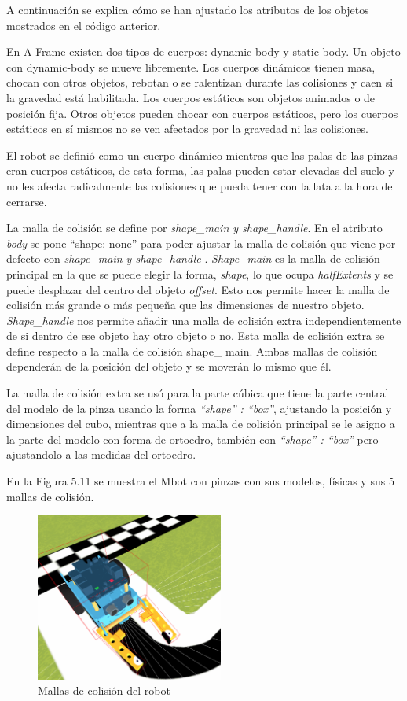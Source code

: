 A continuación se explica cómo se han ajustado los atributos de los objetos mostrados en el código anterior.

En A-Frame existen dos tipos de cuerpos: dynamic-body y static-body. Un objeto con dynamic-body  se mueve libremente. Los cuerpos dinámicos tienen masa, chocan con otros objetos, rebotan o se ralentizan durante las colisiones y caen si la gravedad está habilitada.
Los cuerpos estáticos son objetos animados o de posición fija. Otros objetos pueden chocar con cuerpos estáticos, pero los cuerpos estáticos en sí mismos no se ven afectados por la gravedad ni las colisiones.

El robot se definió como un cuerpo dinámico mientras que las palas de las pinzas eran cuerpos estáticos, de esta forma, las palas pueden estar elevadas del suelo y no les afecta  radicalmente las colisiones que pueda tener con la lata a la hora de cerrarse.

La malla de colisión se define por \textit{shape\_main y shape\_handle}. En el atributo \textit{body} se pone ``shape: none'' para poder ajustar la malla de colisión que viene por defecto con \textit{shape\_main y shape\_handle} .
\textit{Shape\_main} es la malla de colisión principal en la que se puede elegir la forma, \textit{shape}, lo que ocupa \textit{halfExtents} y se puede desplazar del centro del objeto \textit{offset}. Esto nos permite hacer la malla de colisión más grande o más pequeña que las dimensiones de nuestro objeto. \textit{ Shape\_handle} nos permite añadir una malla de colisión extra independientemente de si dentro de ese  objeto hay otro objeto o no. Esta malla de colisión extra se define respecto a la malla de colisión shape\_ main. Ambas mallas de colisión dependerán de la posición del objeto y se moverán lo mismo que él.

La malla de colisión extra se usó para la parte cúbica que tiene la parte central del modelo de la pinza usando la forma  \textit{ ``shape'' : ``box''},  ajustando  la posición y dimensiones del cubo, mientras que a la malla de colisión principal se le asigno a la parte del modelo con forma de ortoedro, también con \textit{ ``shape'' : ``box''} pero ajustandolo a las medidas del ortoedro.

En la Figura  5.11 se muestra el Mbot con pinzas con sus modelos, físicas y sus 5 mallas de colisión.

 \begin{figure}[H]
  \centering
 \includegraphics[width=0.55\textwidth]{chapters/images/mallas.png}
  \caption{Mallas de colisión del robot}
\end{figure}


